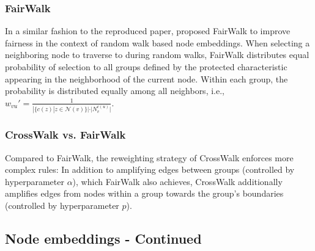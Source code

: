 \subsubsection*{FairWalk} In a similar fashion to the reproduced paper, \citet{Rahman2019} proposed FairWalk to improve fairness in the context of random walk based node embeddings. When selecting a neighboring node to traverse to during random walks, FairWalk distributes equal probability of selection to all groups defined by the protected characteristic appearing in the neighborhood of the current node. Within each group, the probability is distributed equally among all neighbors, i.e., $w_{vu}' = \frac{1}{|\{ c(z) | z \in \mathcal{N}(v) \}| \cdot |N_v^{c(u)}|}$.



\subsubsection*{CrossWalk vs. FairWalk} 
Compared to FairWalk, the reweighting strategy of CrossWalk enforces more complex rules: In addition to amplifying edges between groups (controlled by hyperparameter $\alpha$), which FairWalk also achieves, CrossWalk additionally amplifies edges from nodes within a group towards the group's boundaries (controlled by hyperparameter $p$).


\subsection{Node embeddings - Continued}
\label{subsec:embeddings-cont}

